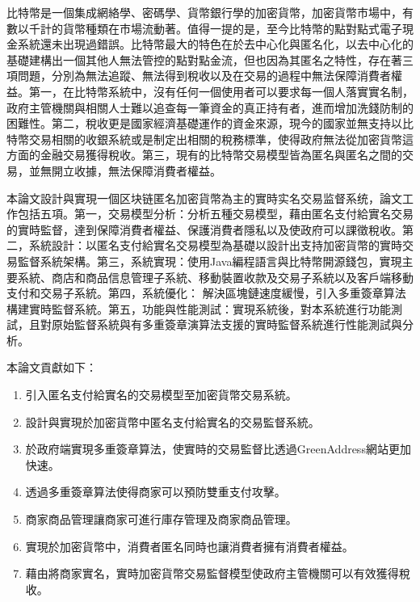 
\begin{cabstract}

	比特幣是一個集成網絡學、密碼學、貨幣銀行學的加密貨幣，加密貨幣市場中，有數以千計的貨幣種類在市場流動著。值得一提的是，至今比特幣的點對點式電子現金系統還未出現過錯誤。比特幣最大的特色在於去中心化與匿名化，以去中心化的基礎建構出一個其他人無法管控的點對點金流，但也因為其匿名之特性，存在著三項問題，分別為無法追蹤、無法得到稅收以及在交易的過程中無法保障消費者權益。第一，在比特幣系統中，沒有任何一個使用者可以要求每一個人落實實名制，政府主管機關與相關人士難以追查每⼀筆資金的真正持有者，進而增加洗錢防制的困難性。第二，稅收更是國家經濟基礎運作的資金來源，現今的國家並無支持以比特幣交易相關的收銀系統或是制定出相關的稅務標準，使得政府無法從加密貨幣這方面的金融交易獲得稅收。第三，現有的比特幣交易模型皆為匿名與匿名之間的交易，並無開立收據，無法保障消費者權益。

	本論文設計與實現一個区块链匿名加密貨幣為主的實時实名交易监督系统，論文工作包括五項。第一，交易模型分析：分析五種交易模型，藉由匿名支付給實名交易的實時監督，達到保障消費者權益、保護消費者隱私以及使政府可以課徵稅收。第二，系統設計：以匿名支付給實名交易模型為基礎以設計出支持加密貨幣的實時交易監督系統架構。第三，系統實現：使用Java編程語言與比特幣開源錢包，實現主要系統、商店和商品信息管理子系統、移動裝置收款及交易子系統以及客戶端移動支付和交易子系統。第四，系統優化：
	解決區塊鏈速度緩慢，引入多重簽章算法構建實時監督系統。第五，功能與性能測試：實現系統後，對本系統進行功能測試，且對原始監督系統與有多重簽章演算法支援的實時監督系統進行性能測試與分析。

	本論文貢獻如下：
	\begin{enumerate}
		\item 引入匿名支付給實名的交易模型至加密貨幣交易系統。
		\item 設計與實現於加密貨幣中匿名支付給實名的交易監督系統。
		\item 於政府端實現多重簽章算法，使實時的交易監督比透過GreenAddress網站更加快速。
		\item 透過多重簽章算法使得商家可以預防雙重支付攻擊。
		\item 商家商品管理讓商家可進行庫存管理及商家商品管理。
		\item 實現於加密貨幣中，消費者匿名同時也讓消費者擁有消費者權益。
		\item 藉由將商家實名，實時加密貨幣交易監督模型使政府主管機關可以有效獲得稅收。
	\end{enumerate}


\end{cabstract}

